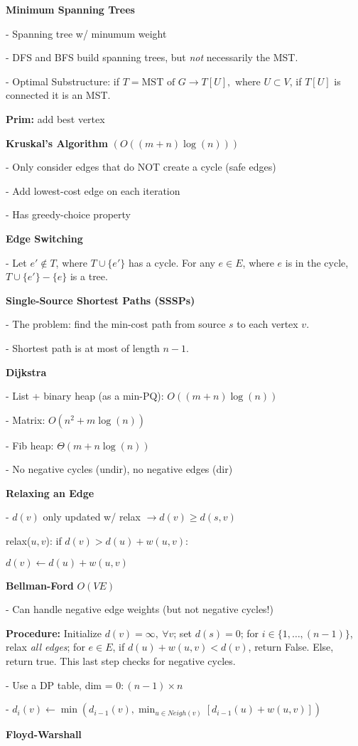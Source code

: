 \documentclass[letterpaper]{article}
\begin{document}
\begin{minipage}[t]{0.45\textwidth}

\textbf{Minimum Spanning Trees}

- Spanning tree w/ minumum weight

- DFS and BFS build spanning trees, but \emph{not} necessarily the MST.

- Optimal Substructure: if $T = \text{MST of } G \rightarrow T[U], \text{ where } U \subset V$, if $T[U]$ is connected it is an MST.

\textbf{Prim: } add best vertex

\textbf{Kruskal's Algorithm} $(O((m + n)\log(n)))$

- Only consider edges that do NOT create a cycle (safe edges)

- Add lowest-cost edge on each iteration

- Has greedy-choice property

\textbf{Edge Switching}

- Let $e' \notin T$, where $T \cup \{e'\}$ has a cycle. For any $e \in E$, where $e$ is in the cycle, $T \cup \{e'\} - \{e\}$ is a tree.

\textbf{Single-Source Shortest Paths (SSSPs)}

- The problem: find the min-cost path from source $s$ to each vertex $v$.

- Shortest path is at most of length $n-1$.

\textbf{Dijkstra}

- List + binary heap (as a min-PQ): $O((m+n)\log(n))$

- Matrix: $O(n^2 + m\log(n))$

- Fib heap: $\Theta(m + n\log(n))$

- No negative cycles (undir), no negative edges (dir)

\textbf{Relaxing an Edge}

- $d(v)$ only updated w/ relax $\rightarrow d(v) \geq d(s, v)$

relax($u, v$): if $d(v) > d(u) + w(u, v)$:

\hspace{0.5cm} $d(v) \leftarrow d(u) + w(u, v)$

\textbf{Bellman-Ford} $O(VE)$

- Can handle negative edge weights (but not negative cycles!)

{\small \textbf{Procedure:}
Initialize $d(v) = \infty,\ \forall v$; set $d(s) = 0$; for $i \in \{1, \ldots, (n-1)\}$, relax \emph{all edges}; for $e \in E$, if $d(u) + w(u, v) < d(v)$, return False. Else, return true. This last step checks for negative cycles.}

- Use a DP table, dim = $0:(n-1) \times n$

- $d_{i}(v) \leftarrow \min(d_{i-1}(v), \min_{u \in Neigh(v)}[d_{i-1}(u) + w(u,v)])$

\textbf{Floyd-Warshall}

\end{minipage}
\end{document}
